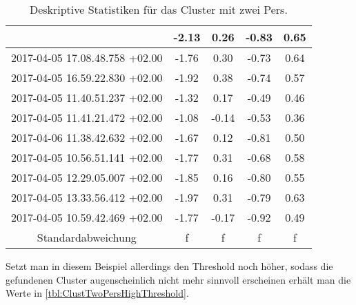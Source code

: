 \begin{center}
\begin{table}[ht]
\begin{tabular}{ |c|c|c|c|c| }
        & -2.13
        & 0.26
        & -0.83
        & 0.65 \\
        \hline
        2017-04-05 17.08.48.758 +02.00
        & -1.76
        & 0.30
        & -0.73
        & 0.64 \\
        \hline
        2017-04-05 16.59.22.830 +02.00
        & -1.92
        & 0.38
        & -0.74
        & 0.57 \\
        \hline
        2017-04-05 11.40.51.237 +02.00
        & -1.32
        & 0.17
        & -0.49
        & 0.46 \\
        \hline
        2017-04-05 11.41.21.472 +02.00
        & -1.08
        & -0.14
        & -0.53
        & 0.36 \\
        \hline
        2017-04-06 11.38.42.632 +02.00
        & -1.67
        & 0.12
        & -0.81
        & 0.50 \\
        \hline
        2017-04-05 10.56.51.141 +02.00
        & -1.77
        & 0.31
        & -0.68
        & 0.58 \\
        \hline
        2017-04-05 12.29.05.007 +02.00
        & -1.85
        & 0.16
        & -0.80
        & 0.55 \\
        \hline
        2017-04-05 13.33.56.412 +02.00
        & -1.97
        & 0.31
        & -0.79
        & 0.63 \\
        \hline
        2017-04-05 10.59.42.469 +02.00
        & -1.77
        & -0.17
        & -0.92
        & 0.49 \\
        \hline
        \hline
        Standardabweichung
        & f
        & f
        & f
        & f \\
        \hline
       \end{tabular}
    \caption{Deskriptive Statistiken für das Cluster mit zwei Pers.}
    \label{tbl:ClustTwoPers}
    \end{table}
  \end{center}
  Setzt man in diesem Beispiel allerdings den Threshold noch höher,
  sodass die gefundenen Cluster augenscheinlich nicht mehr sinnvoll erscheinen
  erhält man die Werte in \autoref{tbl:ClustTwoPersHighThreshold}.
